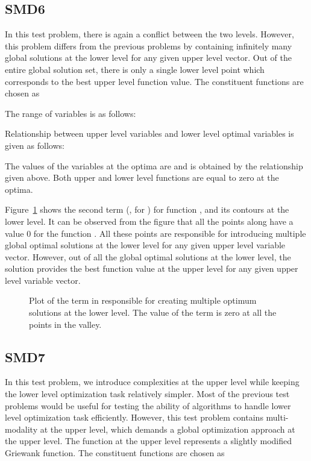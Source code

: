 \documentclass[twoside]{article}
\begin{document}
\subsection{SMD6}
In this test problem, there is again a conflict between the two levels. However, this problem differs from the previous problems by containing infinitely many global solutions at the lower level for any given upper level vector. Out of the entire global solution set, there is only a single lower level point which corresponds to the best upper level function value. The constituent functions are chosen as

The range of variables is as follows:

Relationship between upper level variables and lower level optimal variables is given as follows:

The values of the variables at the optima are  and  is obtained by the relationship given above. Both upper and
lower level functions are equal to zero at the optima.

Figure~\ref{fig:multipleOpt} shows the second term (, for ) for function , and its contours at the lower level. It can be observed from the figure that all the points along  have a value 0 for the function . All these points are responsible for introducing multiple global optimal solutions at the lower level for any given upper level variable vector. However, out of all the global optimal solutions at the lower level, the solution  provides the best function value at the upper level for any given upper level variable vector.

\begin{figure}
\begin{center}
\caption{Plot of the term in  responsible for creating multiple optimum solutions at the lower level. The value of the term is zero at all the points in the valley.}
\label{fig:multipleOpt}
\end{center}
\end{figure}

\subsection{SMD7}
In this test problem, we introduce complexities at the upper level while keeping the lower level optimization task relatively simpler. Most of the previous test problems would be useful for testing the ability of algorithms to handle lower level optimization task efficiently. However, this test problem contains multi-modality at the upper level, which demands a global optimization approach at the upper level. The function  at the upper level represents a slightly modified Griewank function. The constituent functions are chosen as
\end{document}
